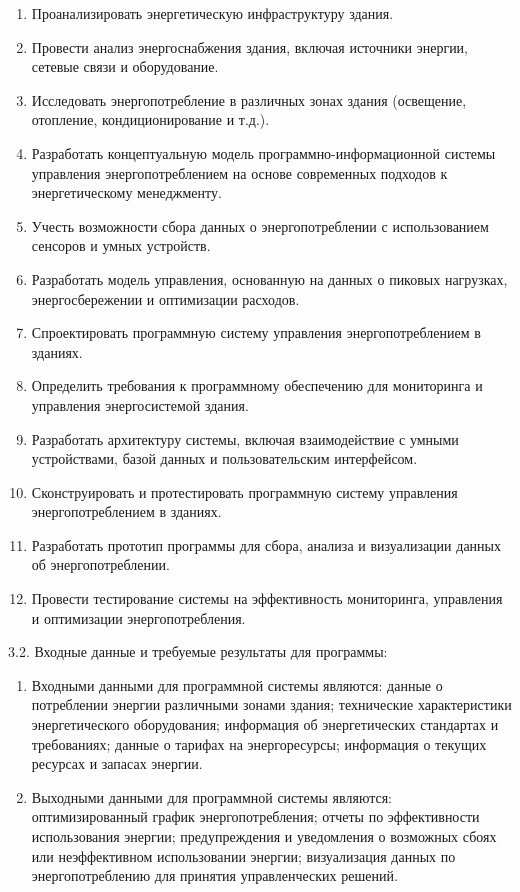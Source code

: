 \begin{enumerate}
 
\item Проанализировать энергетическую инфраструктуру здания.
\item Провести анализ энергоснабжения здания, включая источники энергии, сетевые связи и оборудование.
\item Исследовать энергопотребление в различных зонах здания (освещение, отопление, кондиционирование и т.д.).
		
\item Разработать концептуальную модель программно-информационной системы управления энергопотреблением на основе современных подходов к энергетическому менеджменту.
\item Учесть возможности сбора данных о энергопотреблении с использованием сенсоров и умных устройств.
\item Разработать модель управления, основанную на данных о пиковых нагрузках, энергосбережении и оптимизации расходов.

\item Спроектировать программную систему управления энергопотреблением в зданиях.
\item Определить требования к программному обеспечению для мониторинга и управления энергосистемой здания.
\item Разработать архитектуру системы, включая взаимодействие с умными устройствами, базой данных и пользовательским интерфейсом.

\item Сконструировать и протестировать программную систему управления энергопотреблением в зданиях.
\item Разработать прототип программы для сбора, анализа и визуализации данных об энергопотреблении.
\item Провести тестирование системы на эффективность мониторинга, управления и оптимизации энергопотребления.

\end{enumerate}

{\parindent0pt
  3.2. Входные данные и требуемые результаты для программы:}

\begin{enumerate}

\item Входными данными для программной системы являются: данные о потреблении энергии различными зонами здания; технические характеристики энергетического оборудования; информация об энергетических стандартах и требованиях; данные о тарифах на энергоресурсы; информация о текущих ресурсах и запасах энергии.

\item Выходными данными для программной системы являются: оптимизированный график энергопотребления; отчеты по эффективности использования энергии; предупреждения и уведомления о возможных сбоях или неэффективном использовании энергии; визуализация данных по энергопотреблению для принятия управленческих решений.

\end{enumerate}

